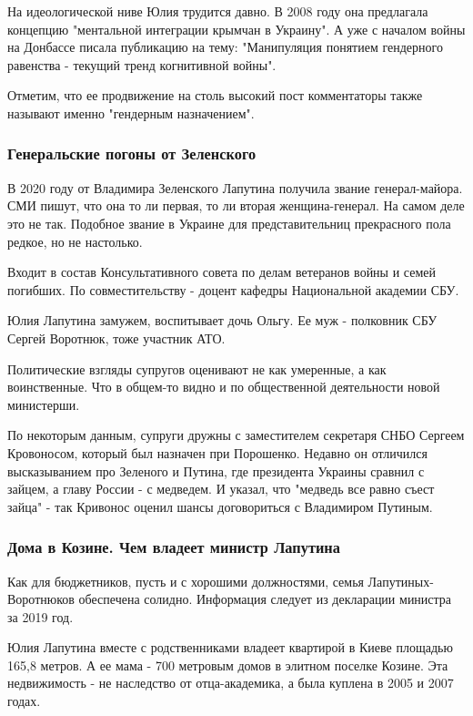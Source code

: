 На идеологической ниве Юлия трудится давно. В 2008 году она предлагала
концепцию "ментальной интеграции крымчан в Украину". А уже с началом войны на
Донбассе писала публикацию на тему: "Манипуляция понятием гендерного равенства
- текущий тренд когнитивной войны".

Отметим, что ее продвижение на столь высокий пост комментаторы также называют
именно "гендерным назначением".

\subsubsection{Генеральские погоны от Зеленского}

В 2020 году от Владимира Зеленского Лапутина получила звание генерал-майора.
СМИ пишут, что она то ли первая, то ли вторая женщина-генерал. На самом деле
это не так. Подобное звание в Украине для представительниц прекрасного пола
редкое, но не настолько. 

Входит в состав Консультативного совета по делам ветеранов войны и семей
погибших. По совместительству - доцент кафедры Национальной академии СБУ. 

Юлия Лапутина замужем, воспитывает дочь Ольгу. Ее муж - полковник СБУ Сергей
Воротнюк, тоже участник АТО. 

Политические взгляды супругов оценивают не как умеренные, а как воинственные.
Что в общем-то видно и по общественной деятельности новой министерши. 

По некоторым данным, супруги дружны с заместителем секретаря СНБО Сергеем
Кровоносом, который был назначен при Порошенко. Недавно он отличился
высказыванием про Зеленого и Путина, где президента Украины сравнил с зайцем, а
главу России - с медведем. И указал, что "медведь все равно съест зайца" - так
Кривонос оценил шансы договориться с Владимиром Путиным.

\subsubsection{Дома в Козине. Чем владеет министр Лапутина}

Как для бюджетников, пусть и с хорошими должностями, семья Лапутиных-Воротнюков
обеспечена солидно. Информация следует из декларации министра за 2019 год. 

Юлия Лапутина вместе с родственниками владеет квартирой в Киеве площадью 165,8
метров. А ее мама - 700 метровым домов в элитном поселке Козине. Эта
недвижимость - не наследство от отца-академика, а была куплена в 2005 и 2007
годах.


